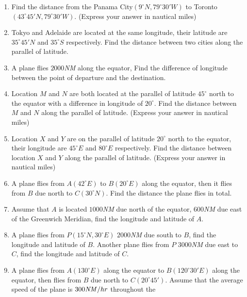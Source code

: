 \documentclass{report}
\begin{document}
\begin{multicols}{2}
\begin{enumerate}
\begin{center}
\begin{tikzpicture}
                  \end{tikzpicture}
              \end{center}
        \item Find the distance from the Panama City$(9^\circ N, 79^\circ 30' W)$ to Toronto
              $(43^\circ 45' N, 79^\circ 30' W)$. (Express your answer in nautical miles)
        \item Tokyo and Adelaide are located at the same longitude, their latitude are
              $35^\circ 45' N$ and $35^\circ S$ respectively. Find the distance between two
              cities along the parallel of latitude.
        \item A plane flies $2000$\emph{NM} along the equator, Find the difference of
              longitude between the point of departure and the destination.
        \item Location $M$ and $N$ are both located at the parallel of latitude $45^\circ$
              north to the equator with a difference in longitude of $20^\circ$. Find the
              distance between $M$ and $N$ along the parallel of latitude. (Express your
              answer in nautical miles)
        \item Location $X$ and $Y$ are on the parallel of latitude $20^\circ$ north to the
              equator, their longitude are $45^\circ E$ and $80^\circ E$ respectively. Find
              the distance between location $X$ and $Y$ along the parallel of latitude.
              (Express your answer in nautical miles)
        \item A plane flies from $A(42^\circ E)$ to $B(20^\circ E)$ along the equator, then
              it flies from $B$ due north to $C(30^\circ N)$. Find the distance the plane
              flies in total.
        \item Assume that $A$ is located $1000$\emph{NM} due north of the equator,
              $600$\emph{NM} due east of the Greenwich Meridian, find the longitude and
              latitude of $A$.
        \item A plane flies from $P(15^\circ N, 30^\circ E)$ $2000$\emph{NM} due south to
              $B$, find the longitude and latitude of $B$. Another plane flies from $P$
              $3000$\emph{NM} due east to $C$, find the longitude and latitude of $C$.
        \item A plane flies from $A(130^\circ E)$ along the equator to $B(120^\circ 30' E)$
              along the equator, then flies from $B$ due north to $C(20^\circ 45')$. Assume
              that the average speed of the plane is $300\text{\emph{NM}}/hr$ throughout the

\end{enumerate}
\end{multicols}
\end{document}
